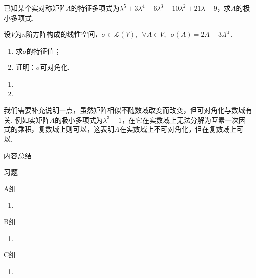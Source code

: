 \begin{example}
    已知某个实对称矩阵$A$的特征多项式为$\lambda^5+3\lambda^4-6\lambda^3-10\lambda^2+21\lambda-9$，求$A$的极小多项式.
\end{example}

\begin{solution}

\end{solution}

\begin{example}
    设$V$为$n$阶方阵构成的线性空间，$\sigma\in \mathcal{L}(V),\enspace \forall A\in V,\enspace \sigma(A)=2A-3A^{\mathrm{T}}$.
    \begin{enumerate}
        \item 求$\sigma$的特征值；

        \item 证明：$\sigma$可对角化.
    \end{enumerate}
\end{example}

\begin{solution}
    \begin{enumerate}
        \item

        \item
    \end{enumerate}
\end{solution}

我们需要补充说明一点，虽然矩阵相似不随数域改变而改变，但可对角化与数域有关. 例如实矩阵$A$的极小多项式为$\lambda^3-1$，在它在实数域上无法分解为互素一次因式的乘积，复数域上则可以，这表明$A$在实数域上不可对角化，但在复数域上可以.

\vspace{2ex}
\centerline{\heiti \Large 内容总结}

\vspace{2ex}
\centerline{\heiti \Large 习题}

\vspace{2ex}
{\kaishu }
\begin{flushright}
    \kaishu

\end{flushright}

\centerline{\heiti A组}
\begin{enumerate}
    \item
\end{enumerate}

\centerline{\heiti B组}
\begin{enumerate}
    \item
\end{enumerate}

\centerline{\heiti C组}
\begin{enumerate}
    \item
\end{enumerate}

